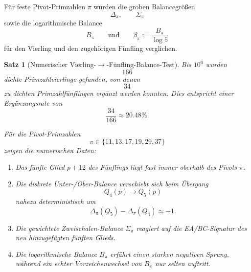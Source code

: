 \documentclass[11pt,a4paper]{article}
\newtheorem{satz}{Satz}
\theoremstyle{definition}
\theoremstyle{remark}
\begin{document}
	Für feste Pivot-Primzahlen \(\pi\) wurden die groben Balancegrößen
	\[
	\Delta_\pi,\qquad \Sigma_\pi
	\]
	sowie die logarithmische Balance
	\[
	B_\pi
	\qquad\text{und}\qquad
	\beta_\pi:=\frac{B_\pi}{\log 5}
	\]
	für den Vierling und den zugehörigen Fünfling verglichen.
	
	\begin{satz}[Numerischer Vierling-\(\to\)-Fünfling-Balance-Test]
		\label{satz:vierling_fuenfling_balance}
		Bis \(10^6\) wurden
		\[
		166
		\]
		dichte Primzahlvierlinge gefunden, von denen
		\[
		34
		\]
		zu dichten Primzahlfünflingen ergänzt werden konnten. Dies entspricht einer
		Ergänzungsrate von
		\[
		\frac{34}{166}\approx 20.48\%.
		\]
		
		Für die Pivot-Primzahlen
		\[
		\pi\in\{11,13,17,19,29,37\}
		\]
		zeigen die numerischen Daten:
		
		\begin{enumerate}
			\item Das fünfte Glied \(p+12\) des Fünflings liegt fast immer oberhalb des Pivots
			\(\pi\).
			
			\item Die diskrete Unter-/Ober-Balance verschiebt sich beim Übergang
			\[
			Q_4(p)\to Q_5(p)
			\]
			nahezu deterministisch um
			\[
			\Delta_\pi(Q_5)-\Delta_\pi(Q_4)\approx -1.
			\]
			
			\item Die gewichtete Zweischalen-Balance \(\Sigma_\pi\) reagiert auf die EA/BC-Signatur des
			neu hinzugefügten fünften Glieds.
			
			\item Die logarithmische Balance \(B_\pi\) erfährt einen starken negativen Sprung,
			während ein echter Vorzeichenwechsel von \(B_\pi\) nur selten auftritt.
		\end{enumerate}
	\end{satz}
	
\end{document}
